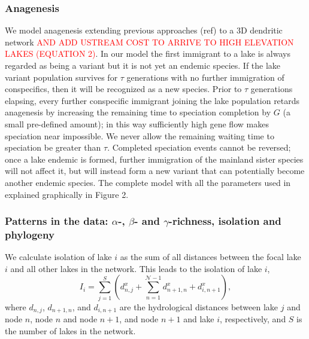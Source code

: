 \documentclass[11pt]{article}
\newcommand{\carlos}[1]{\textcolor{Red}{#1}}
\begin{document}
{\subsubsection{Anagenesis}

We model anagenesis extending previous approaches (ref) to a 3D
dendritic network \carlos{AND ADD USTREAM COST TO ARRIVE TO HIGH ELEVATION
LAKES (EQUATION 2)}. In our model the first immigrant to a lake is
always regarded as being a variant but it is not yet an endemic
species. If the lake variant population survives for $\tau$
generations with no further immigration of conspecifics, then it will
be recognized as a new species. Prior to $\tau$ generations elapsing,
every further conspecific immigrant joining the lake population
retards anagenesis by increasing the remaining time to speciation
completion by $G$ (a small pre-defined amount); in this way
sufficiently high gene flow makes speciation near impossible. We never
allow the remaining waiting time to speciation be greater than
$\tau$. Completed speciation events cannot be reversed; once a lake
endemic is formed, further immigration of the mainland sister species
will not affect it, but will instead form a new variant that can
potentially become another endemic species. The complete model with
all the parameters used in explained graphically in Figure 2.

\subsubsection{Patterns in the data: $\alpha$-, $\beta$- and $\gamma$-richness, isolation and phylogeny}




We calculate isolation of lake $i$ as the sum of all distances between
the focal lake $i$ and all other lakes in the network. This leads to
the isolation of lake $i$,
\begin{equation}
I_{i} =  \sum_{j=1}^{S} \left(d_{n,j}^{x} + \sum\limits_{n = 1}^{\mathcal{N}-1} d_{n+1,n}^{x} + d_{i,n+1}^{x}\right),
\label{dispfreq2}
\end{equation}
where $d_{n,j}$, $d_{n+1,n}$, and $d_{i,n+1}$ are the hydrological
distances between lake $j$ and node $n$, node $n$ and node $n+1$, and
node $n+1$ and lake $i$, respectively, and $S$ is the number of lakes
in the network.


}
\end{document}

